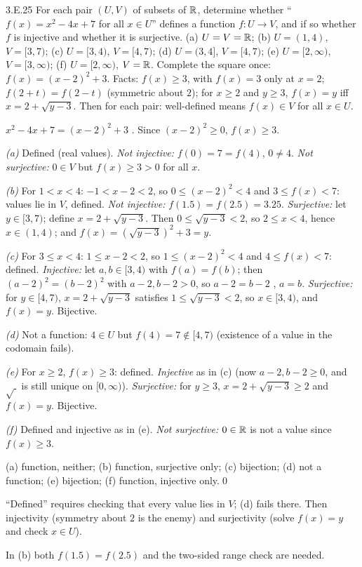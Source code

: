 \begin{bookex}{3.E.25}
For each pair $(U,V)$ of subsets of $\mathbb{R}$, determine whether ``$f(x)=x^2-4x+7$ for all $x\in U$'' defines a function $f:U\to V$, and if so whether $f$ is injective and whether it is surjective. (a) $U=V=\mathbb{R}$; (b) $U=(1,4)$, $V=[3,7)$; (c) $U=[3,4)$, $V=[4,7)$; (d) $U=(3,4]$, $V=[4,7)$; (e) $U=[2,\infty)$, $V=[3,\infty)$; (f) $U=[2,\infty)$, $V=\mathbb{R}$.
\solution
\plan Complete the square once: $f(x)=(x-2)^2+3$. Facts: $f(x)\ge3$, with $f(x)=3$ only at $x=2$; $f(2+t)=f(2-t)$ (symmetric about $2$); for $x\ge2$ and $y\ge3$, $f(x)=y$ iff $x=2+\sqrt{y-3}$. Then for each pair: well-defined means $f(x)\in V$ for all $x\in U$.
\begin{steps}
\item $x^2-4x+7=(x-2)^2+3$ . Since $(x-2)^2\ge0$, $f(x)\ge3$.
\item \emph{(a)} Defined (real values). \emph{Not injective:} $f(0)=7=f(4)$, $0\ne4$. \emph{Not surjective:} $0\in V$ but $f(x)\ge3>0$ for all $x$.
\item \emph{(b)} For $1<x<4$: $-1<x-2<2$, so $0\le(x-2)^2<4$ and $3\le f(x)<7$: values lie in $V$, defined. \emph{Not injective:} $f(1.5)=f(2.5)=3.25$. \emph{Surjective:} let $y\in[3,7)$; define $x=2+\sqrt{y-3}$. Then $0\le\sqrt{y-3}<2$, so $2\le x<4$, hence $x\in(1,4)$; and $f(x)=(\sqrt{y-3})^2+3=y$.
\item \emph{(c)} For $3\le x<4$: $1\le x-2<2$, so $1\le(x-2)^2<4$ and $4\le f(x)<7$: defined. \emph{Injective:} let $a,b\in[3,4)$ with $f(a)=f(b)$; then $(a-2)^2=(b-2)^2$ with $a-2,b-2>0$, so $a-2=b-2$ , $a=b$. \emph{Surjective:} for $y\in[4,7)$, $x=2+\sqrt{y-3}$ satisfies $1\le\sqrt{y-3}<2$, so $x\in[3,4)$, and $f(x)=y$. Bijective.
\item \emph{(d)} Not a function: $4\in U$ but $f(4)=7\notin[4,7)$ (existence of a value in the codomain fails).
\item \emph{(e)} For $x\ge2$, $f(x)\ge3$: defined. \emph{Injective} as in (c) (now $a-2,b-2\ge0$, and $\sqrt{\ }$ is still unique on $[0,\infty)$). \emph{Surjective:} for $y\ge3$, $x=2+\sqrt{y-3}\ge2$ and $f(x)=y$. Bijective.
\item \emph{(f)} Defined and injective as in (e). \emph{Not surjective:} $0\in\mathbb{R}$ is not a value since $f(x)\ge3$.
\end{steps}
\conclusion (a) function, neither; (b) function, surjective only; (c) bijection; (d) not a function; (e) bijection; (f) function, injective only.\qed
\begin{compare}
\item ``Defined'' requires checking that every value lies in $V$; (d) fails there. Then injectivity (symmetry about $2$ is the enemy) and surjectivity (solve $f(x)=y$ and check $x\in U$).
\item In (b) both $f(1.5)=f(2.5)$ and the two-sided range check are needed.
\end{compare}
\end{bookex}

